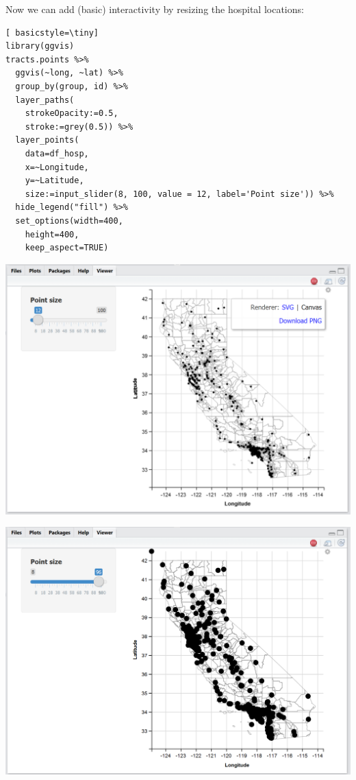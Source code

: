 \begin{frame}
\newpage
Now we can add (basic) interactivity by resizing the hospital locations:

\begin{lstlisting}[ basicstyle=\tiny]
library(ggvis)
tracts.points %>%
  ggvis(~long, ~lat) %>%
  group_by(group, id) %>%
  layer_paths(
    strokeOpacity:=0.5, 
    stroke:=grey(0.5)) %>%
  layer_points(
    data=df_hosp, 
    x=~Longitude, 
    y=~Latitude, 
    size:=input_slider(8, 100, value = 12, label='Point size')) %>%
  hide_legend("fill") %>%
  set_options(width=400, 
    height=400, 
    keep_aspect=TRUE)
\end{lstlisting}

\newpage
  \begin{center}
    \includegraphics[scale=0.55]{images/shapefile_v3-4-1.png}
  \end{center}

\newpage
  \begin{center}
    \includegraphics[scale=0.55]{images/shapefile_v3-4-2.png}
  \end{center}

\end{frame}

